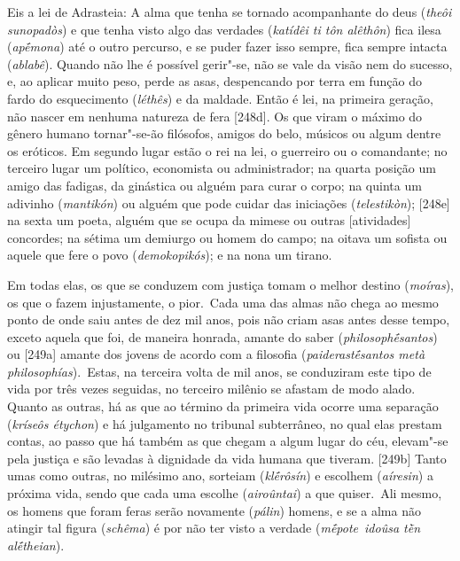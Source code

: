 Eis a lei de Adrasteia: A alma que tenha se tornado acompanhante do deus
(\emph{theôi sunopadòs}) e que tenha visto algo das verdades
(\emph{katídêi ti tôn alêthôn}) fica ilesa (\emph{apḗmona}) até o outro
percurso, e se puder fazer isso sempre, fica sempre intacta
(\emph{ablabê}). Quando não lhe é possível gerir"-se, não se vale da
visão nem do sucesso, e, ao aplicar muito peso, perde as asas,
despencando por terra em função do fardo do esquecimento (\emph{léthês})
e da maldade. Então é lei, na primeira geração, não nascer em nenhuma
natureza de fera [248d]. Os que viram o máximo do gênero humano
tornar"-se-ão filósofos, amigos do belo, músicos ou algum dentre os
eróticos. Em segundo lugar estão o rei na lei, o guerreiro ou o
comandante; no terceiro lugar um político, economista ou administrador;
na quarta posição um amigo das fadigas, da ginástica ou alguém para
curar o corpo; na quinta um adivinho (\emph{mantikón}) ou alguém que
pode cuidar das iniciações (\emph{telestikòn}); [248e] na sexta um
poeta, alguém que se ocupa da mimese ou outras [atividades]
concordes; na sétima um demiurgo ou homem do campo; na oitava um sofista
ou aquele que fere o povo (\emph{demokopikós}); e na nona um tirano.

Em todas elas, os que se conduzem com justiça tomam o melhor destino
(\emph{moíras}), os que o fazem injustamente, o pior.~Cada uma das almas
não chega ao mesmo ponto de onde saiu antes de dez mil anos, pois não
criam asas antes desse tempo, exceto aquela que foi, de maneira honrada,
amante do saber (\emph{philosophḗsantos}) ou [249a] amante dos
jovens de acordo com a filosofia (\emph{paiderastḗsantos metà
philosophías}).\emph{~}Estas, na terceira volta de mil anos, se
conduziram este tipo de vida por três vezes seguidas, no terceiro
milênio se afastam de modo alado. Quanto as outras, há as que ao término
da primeira vida ocorre uma separação (\emph{kríseôs étychon}) e há
julgamento no tribunal subterrâneo, no qual elas prestam contas, ao
passo que há também as que chegam a algum lugar do céu, elevam"-se pela
justiça e são levadas à dignidade da vida humana que tiveram. [249b]
Tanto umas como outras, no milésimo ano, sorteiam (\emph{klḗrôsín}) e
escolhem (\emph{aíresin}) a próxima vida, sendo que cada uma escolhe
(\emph{airoûntai}) a que quiser.~Ali mesmo, os homens que foram feras
serão novamente (\emph{pálin}) homens, e se a alma não atingir tal
figura (\emph{schêma}) é por não ter visto a verdade
(\emph{mḗpote}~\emph{idoûsa tḕn alḗtheian}).

